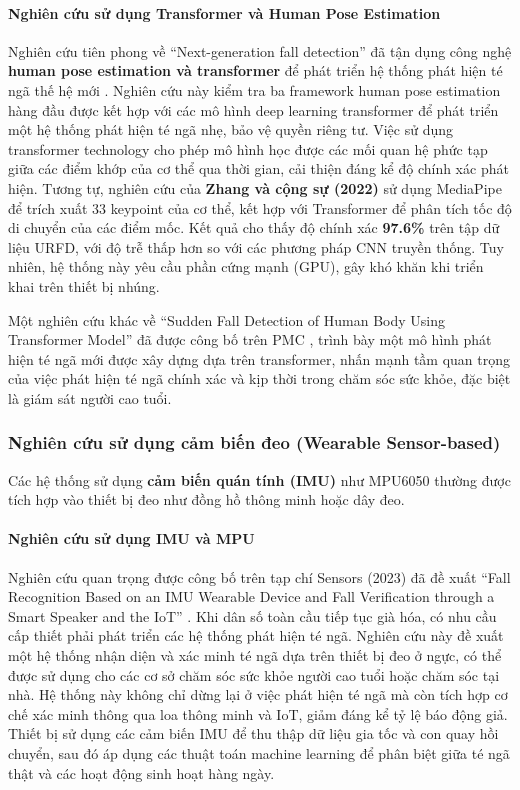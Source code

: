 \paragraph{Nghiên cứu sử dụng Transformer và Human Pose Estimation}
Nghiên cứu tiên phong về ``Next-generation fall detection'' đã tận dụng công nghệ \textbf{human pose estimation và transformer} để phát triển hệ thống phát hiện té ngã thế hệ mới \cite{stylios2024}. Nghiên cứu này kiểm tra ba framework human pose estimation hàng đầu được kết hợp với các mô hình deep learning transformer để phát triển một hệ thống phát hiện té ngã nhẹ, bảo vệ quyền riêng tư. Việc sử dụng transformer technology cho phép mô hình học được các mối quan hệ phức tạp giữa các điểm khớp của cơ thể qua thời gian, cải thiện đáng kể độ chính xác phát hiện. Tương tự, nghiên cứu của \textbf{Zhang và cộng sự (2022)} sử dụng MediaPipe để trích xuất 33 keypoint của cơ thể, kết hợp với Transformer để phân tích tốc độ di chuyển của các điểm mốc. Kết quả cho thấy độ chính xác \textbf{97.6\%} trên tập dữ liệu URFD, với độ trễ thấp hơn so với các phương pháp CNN truyền thống. Tuy nhiên, hệ thống này yêu cầu phần cứng mạnh (GPU), gây khó khăn khi triển khai trên thiết bị nhúng.

Một nghiên cứu khác về ``Sudden Fall Detection of Human Body Using Transformer Model'' đã được công bố trên PMC \cite{pmc2024}, trình bày một mô hình phát hiện té ngã mới được xây dựng dựa trên transformer, nhấn mạnh tầm quan trọng của việc phát hiện té ngã chính xác và kịp thời trong chăm sóc sức khỏe, đặc biệt là giám sát người cao tuổi.

\subsubsection{Nghiên cứu sử dụng cảm biến đeo (Wearable Sensor-based)}
Các hệ thống sử dụng \textbf{cảm biến quán tính (IMU)} như MPU6050 thường được tích hợp vào thiết bị đeo như đồng hồ thông minh hoặc dây đeo.

\paragraph{Nghiên cứu sử dụng IMU và MPU}
Nghiên cứu quan trọng được công bố trên tạp chí Sensors (2023) đã đề xuất ``Fall Recognition Based on an IMU Wearable Device and Fall Verification through a Smart Speaker and the IoT'' \cite{xu2023}. Khi dân số toàn cầu tiếp tục già hóa, có nhu cầu cấp thiết phải phát triển các hệ thống phát hiện té ngã. Nghiên cứu này đề xuất một hệ thống nhận diện và xác minh té ngã dựa trên thiết bị đeo ở ngực, có thể được sử dụng cho các cơ sở chăm sóc sức khỏe người cao tuổi hoặc chăm sóc tại nhà. Hệ thống này không chỉ dừng lại ở việc phát hiện té ngã mà còn tích hợp cơ chế xác minh thông qua loa thông minh và IoT, giảm đáng kể tỷ lệ báo động giả. Thiết bị sử dụng các cảm biến IMU để thu thập dữ liệu gia tốc và con quay hồi chuyển, sau đó áp dụng các thuật toán machine learning để phân biệt giữa té ngã thật và các hoạt động sinh hoạt hàng ngày.

